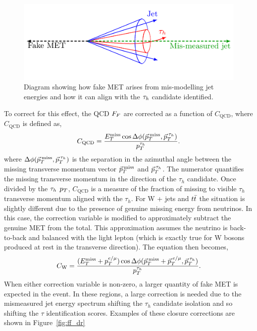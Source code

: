 \begin{figure}[!hbtp]
\centering
   \includegraphics[width=\textwidth]{Figures/fakemet_plot.pdf}
\caption{Diagram showing how fake MET arises from mis-modelling jet energies and how it can align with the $\tau_{h}$ candidate identified.}
\label{fig:fakemet}
\end{figure}

To correct for this effect, the QCD $F_{F}$ are corrected as a function of $C_{\text{QCD}}$, where $C_{\text{QCD}}$ is defined as,
\begin{equation}
C_{\text{QCD}} = \frac{E_{T}^{\text{miss}} \cos\Delta\phi(\vec{p}_{T}^{\text{\hspace{2pt}miss}},\vec{p}_{T}^{\hspace{2pt}\tau_{h}})}{p_{T}^{\tau_{h}}}.
\label{eqn:c_qcd}
\end{equation}
where $\Delta\phi(\vec{p}_{T}^{\hspace{2pt}\text{miss}},\vec{p}_{T}^{\hspace{2pt}\tau_{h}})$ is the separation in the azimuthal angle between the missing transverse momentum vector $\vec{p}_{T}^{\hspace{2pt}\text{miss}}$ and $\vec{p}_{T}^{\hspace{2pt}\tau_{h}}$.
The numerator quantifies the missing transverse momentum in the direction of the $\tau_h$ candidate. 
Once divided by the $\tau_{h}$ $p_{T}$, $C_{\text{QCD}}$ is a measure of the fraction of missing to visible $\tau_h$ transverse momentum aligned with the $\tau_h$.
For W + jets and $t\bar{t}$ the situation is slightly different due to the presence of genuine missing energy from neutrinos.
In this case, the correction variable is modified to approximately subtract the genuine \ac{MET} from the total.
This approximation assumes the neutrino is back-to-back and balanced with the light lepton (which is exactly true for W bosons produced at rest in the transverse direction). 
The equation then becomes,
\begin{equation}
C_{\text{W}} = \frac{(E_{T}^{\text{miss}}+p_{T}^{e/\mu}) \cos\Delta\phi(\vec{p}_{T}^{\text{\hspace{2pt}miss}}+\vec{p}_{T}^{\hspace{2pt}e/\mu},\vec{p}_{T}^{\hspace{2pt}\tau_{h}})}{p_{T}^{\tau_{h}}}.
\label{eqn:c_w}
\end{equation}
When either correction variable is non-zero, a larger quantity of fake \ac{MET} is expected in the event. 
In these regions, a large correction is needed due to the mismeasured jet energy spectrum shifting the $\tau_h$ candidate isolation and so shifting the $\tau$ identification scores. 
Examples of these closure corrections are shown in Figure~\ref{fig:ff_dr}\\

